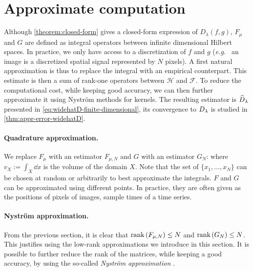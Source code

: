 \section{Approximate computation}\label{sec:approximation}

Although \cref{theorem:closed-form} gives a closed-form expression of $D_\lambda(f,g)$, $F_\mu$ and $G$ are defined as integral operators between infinite dimensional Hilbert spaces. In practice, we only have access to a discretization of $f$ and $g$ (\emph{e.g.\ } an image is a discretized spatial signal represented by $N$ pixels). A first natural approximation is thus to replace the integral with an empirical counterpart. This estimate is then a sum of rank-one operators between $\mathcal H$ and $\mathcal F$. To reduce the computational cost, while keeping good accuracy, we can then further approximate it using Nyström methods for kernels. The resulting estimator is $\widehat{D}_\lambda$ presented in \cref{eq:widehatD-finite-dimensional}, its convergence to $D_\lambda$ is studied in \cref{thm:appr-error-widehatD}.


\paragraph{Quadrature approximation.}

We replace $F_\mu$ with an estimator $F_{\mu, N}$ and $G$ with an estimator $G_N$:
where $v_X := \int_X \dd x$ is the volume of the domain $X$.
Note that the set of $\lbrace x_1, \ldots, x_N \rbrace$ can be chosen at random or arbitrarily to best approximate the integrals. $F$ and $G$ can be approximated using different points. In practice, they are often given as the positions of pixels of images, sample times of a time series.

\paragraph{Nyström approximation.}

From the previous section, it is clear that $\operatorname{rank}\left(F_{\mu, N}\right) \leq N$ and $\operatorname{rank}\left(G_N\right) \leq N$. This justifies using the low-rank approximations we introduce in this section. It is possible to further reduce the rank of the matrices, while keeping a good accuracy, by using the so-called {\em Nystr\"om approximation} \cite{williams2001using,drineas2005nystrom,rudi2015less}.

